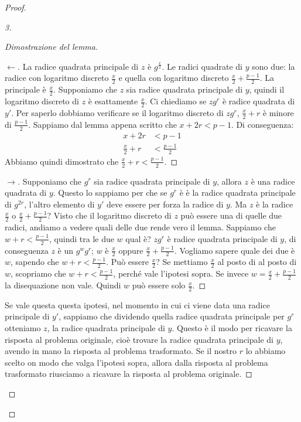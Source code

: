 \begin{proof}
\begin{proof}[3]
\begin{proof}[Dimostrazione del lemma]
\begin{proof}[$\leftarrow$]
La radice quadrata principale di $z$ è $g^\frac{x}{2}$. Le radici quadrate di $y$ sono due: la radice con logaritmo discreto $\frac{x}{2}$ e quella con logaritmo discreto $\frac{x}{2} + \frac{p-1}{2}$. La principale è $\frac{x}{2}$. Supponiamo che $z$ sia radice quadrata principale di $y$, quindi il logaritmo discreto di $z$ è esattamente $\frac{x}{2}$. 
Ci chiediamo se $zg^r$ è radice quadrata di $y'$. Per saperlo dobbiamo verificare se il logaritmo discreto di $zg^r$, $\frac{x}{2}+r$ è minore di $\frac{p-1}{2}$. Sappiamo dal lemma appena scritto che $x+2r < p-1$. Di conseguenza:
\begin{align*}
    x+2r &< p-1\\
    \frac{x}{2}+r &< \frac{p-1}{2}
\end{align*}
\noindent Abbiamo quindi dimostrato che $\frac{x}{2}+r < \frac{p-1}{2}$.
\end{proof}

\begin{proof}[$\rightarrow$]
Supponiamo che $g^r$ sia radice quadrata principale di $y$, allora $z$ è una radice quadrata di $y$. Questo lo sappiamo per che se $g^r$ è è la radice quadrata principale di $g^{2r}$, l'altro elemento di $y'$ deve essere per forza la radice di $y$. Ma $z$ è la radice $\frac{x}{2}$ o $\frac{x}{2} + \frac{p-1}{2}$? Visto che il logaritmo discreto di $z$ può essere una di quelle due radici, andiamo a vedere quali delle due rende vero il lemma. Sappiamo che $w+r < \frac{p-1}{2}$, quindi tra le due $w$ qual è? $zg^r$ è radice quadrata principale di $y$, di conseguenza $z$ è un $g^wg^r$; $w$ è $\frac{x}{2}$ oppure $\frac{x}{2} + \frac{p-1}{2}$. Vogliamo sapere quale dei due è $w$, sapendo che $w+r < \frac{p-1}{2}$. Può essere $\frac{x}{2}$? Se mettiamo $\frac{x}{2}$ al posto di al posto di $w$, scopriamo che $w+r < \frac{p-1}{2}$, perché vale l'ipotesi sopra. Se invece $w=\frac{x}{2} + \frac{p-1}{2}$ la disequazione non vale. Quindi $w$ può essere solo $\frac{x}{2}$.
\end{proof}

\noindent Se vale questa questa ipotesi, nel momento in cui ci viene data una radice principale di $y'$, sappiamo che dividendo quella radice quadrata principale per $g^r$ otteniamo $z$, la radice quadrata principale di $y$. Questo è il modo per ricavare la risposta al problema originale, cioè trovare la radice quadrata principale di $y$, avendo in mano la risposta al problema trasformato. Se il nostro $r$ lo abbiamo scelto on modo che valga l'ipotesi sopra, allora dalla risposta al problema trasformato riusciamo a ricavare la risposta al problema originale. 


\end{proof}
\end{proof}
\end{proof}
